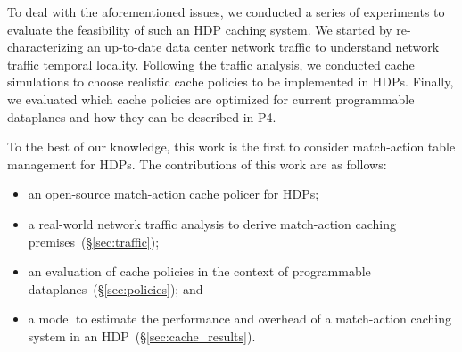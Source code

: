 
To deal with the aforementioned issues, we conducted a series of experiments to evaluate the feasibility of such an HDP caching system.
We started by re-characterizing an up-to-date data center network traffic to understand network traffic temporal locality.
Following the traffic analysis, we conducted cache simulations to choose realistic cache policies to be implemented in HDPs.
Finally, we evaluated which cache policies are optimized for current programmable dataplanes and how they can be described in P4.

To the best of our knowledge, this work is the first to consider match-action table management for HDPs.
The contributions of this work are as follows: 

\begin{itemize}[noitemsep,topsep=0pt]
	\item an open-source match-action cache policer for HDPs;
	\item a real-world network traffic analysis to derive match-action caching premises~(\S\ref{sec:traffic});
	\item an evaluation of cache policies in the context of programmable dataplanes~(\S\ref{sec:policies}); and
	\item a model to estimate the performance and overhead of a match-action caching system in an HDP~(\S\ref{sec:cache_results}).
\end{itemize}
